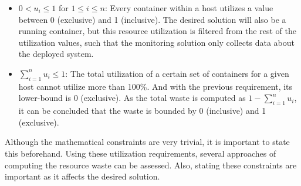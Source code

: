 \begin{itemize}
    \item $0 < u_i \leq 1$ for $1 \leq i \leq n$: Every container within a host utilizes a value between 0 (exclusive) and 1 (inclusive). The desired solution will also be a running container, but this resource utilization is filtered from the rest of the utilization values, such that the monitoring solution only collects data about the deployed system.
    \item $\sum_{i=1}^n u_i \leq 1$: The total utilization of a certain set of containers for a given host cannot utilize more than 100\%. And with the previous requirement, its lower-bound is 0 (exclusive). As the total waste is computed as $1 - \sum_{i=1}^n u_i$, it can be concluded that the waste is bounded by 0 (inclusive) and 1 (exclusive).
\end{itemize}

\noindent
Although the mathematical constraints are very trivial, it is important to state this beforehand. Using these utilization requirements, several approaches of computing the resource waste can be assessed. Also, stating these constraints are important as it affects the desired solution.

 